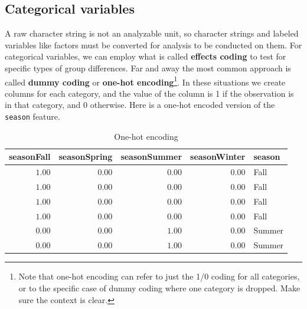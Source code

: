 \documentclass[
  letterpaper,
]{krantz}
\begin{document}
\subsection{Categorical variables}\label{sec-data-cat}

A raw character string is not an analyzable unit, so character strings
and labeled variables like factors must be converted for analysis to be
conducted on them. For categorical variables, we can employ what is
called \textbf{effects coding} to test for specific types of group
differences. Far and away the most common approach is called
\textbf{dummy coding} or \textbf{one-hot encoding}\footnote{Note that
  one-hot encoding can refer to just the 1/0 coding for all categories,
  or to the specific case of dummy coding where one category is dropped.
  Make sure the context is clear.}. In these situations we create
columns for each category, and the value of the column is 1 if the
observation is in that category, and 0 otherwise. Here is a one-hot
encoded version of the \texttt{season} feature.

\begin{longtable}{rrrrl}

\caption{\label{tbl-one-hot}One-hot encoding}

\tabularnewline

\toprule
seasonFall & seasonSpring & seasonSummer & seasonWinter & season \\ 
\midrule\addlinespace[2.5pt]
\textcolor[HTML]{404040}{$1.00$} & \textcolor[HTML]{404040}{$0.00$} & \textcolor[HTML]{404040}{$0.00$} & \textcolor[HTML]{404040}{$0.00$} & Fall \\ 
\textcolor[HTML]{404040}{$1.00$} & \textcolor[HTML]{404040}{$0.00$} & \textcolor[HTML]{404040}{$0.00$} & \textcolor[HTML]{404040}{$0.00$} & Fall \\ 
\textcolor[HTML]{404040}{$1.00$} & \textcolor[HTML]{404040}{$0.00$} & \textcolor[HTML]{404040}{$0.00$} & \textcolor[HTML]{404040}{$0.00$} & Fall \\ 
\textcolor[HTML]{404040}{$1.00$} & \textcolor[HTML]{404040}{$0.00$} & \textcolor[HTML]{404040}{$0.00$} & \textcolor[HTML]{404040}{$0.00$} & Fall \\ 
\textcolor[HTML]{404040}{$0.00$} & \textcolor[HTML]{404040}{$0.00$} & \textcolor[HTML]{404040}{$1.00$} & \textcolor[HTML]{404040}{$0.00$} & Summer \\ 
\textcolor[HTML]{404040}{$0.00$} & \textcolor[HTML]{404040}{$0.00$} & \textcolor[HTML]{404040}{$1.00$} & \textcolor[HTML]{404040}{$0.00$} & Summer \\ 
\bottomrule

\end{longtable}
\end{document}
